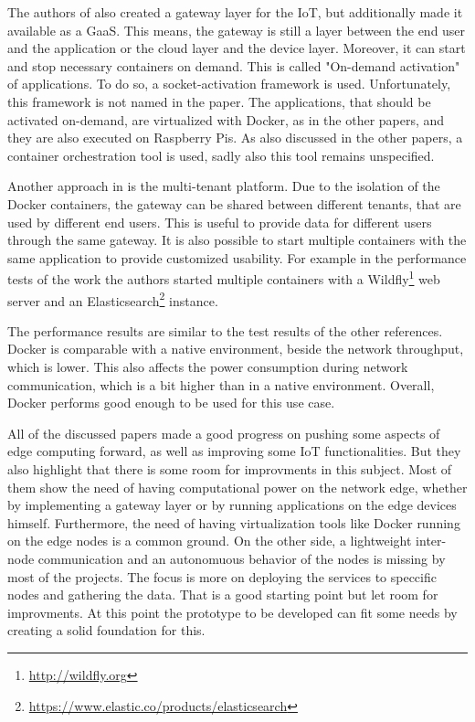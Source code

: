 The authors of \autocite{Morabito:2016} also created a gateway layer for the \ac{IoT}, but additionally made it available as a \ac{GaaS}.
This means, the gateway is still a layer between the end user and the application or the cloud layer and the device layer.
Moreover, it can start and stop necessary containers on demand.
This is called "On-demand activation" of applications.\autocite[cf.][p. 3]{Morabito:2016}
To do so, a socket-activation framework is used.\autocite[cf.][p. 3]{Morabito:2016}
Unfortunately, this framework is not named in the paper.
The applications, that should be activated on-demand, are virtualized with Docker, as in the other papers, and they are also executed on Raspberry Pis.
As also discussed in the other papers, a container orchestration tool is used, sadly also this tool remains unspecified.

Another approach in \autocite{Morabito:2016} is the multi-tenant platform.
Due to the isolation of the Docker containers, the gateway can be shared between different tenants, that are used by different end users.\autocite[cf.][p. 2]{Morabito:2016}
This is useful to provide data for different users through the same gateway.
It is also possible to start multiple containers with the same application to provide customized usability.
For example in the performance tests of the work the authors started multiple containers with a Wildfly\footnote{\url{http://wildfly.org}} web server and an Elasticsearch\footnote{\url{https://www.elastic.co/products/elasticsearch}} instance.\autocite[cf.][p. 2]{Morabito:2016}

The performance results are similar to the test results of the other references.
Docker is comparable with a native environment, beside the network throughput, which is lower.\autocite[cf.][p. 4]{Morabito:2016}
This also affects the power consumption during network communication, which is a bit higher than in a native environment.\autocite[cf.][p. 4]{Morabito:2016}
Overall, Docker performs good enough to be used for this use case.\autocite[cf.][p. 4]{Morabito:2016}

All of the discussed papers made a good progress on pushing some aspects of edge computing forward, as well as improving some \ac{IoT} functionalities.
But they also highlight that there is some room for improvments in this subject.
Most of them show the need of having computational power on the network edge, whether by implementing a gateway layer or by running applications on the edge devices himself.
Furthermore, the need of having virtualization tools like Docker running on the edge nodes is a common ground.
On the other side, a lightweight inter-node communication and an autonomuous behavior of the nodes is missing by most of the projects.
The focus is more on deploying the services to speccific nodes and gathering the data.
That is a good starting point but let room for improvments.
At this point the prototype to be developed can fit some needs by creating a solid foundation for this.
